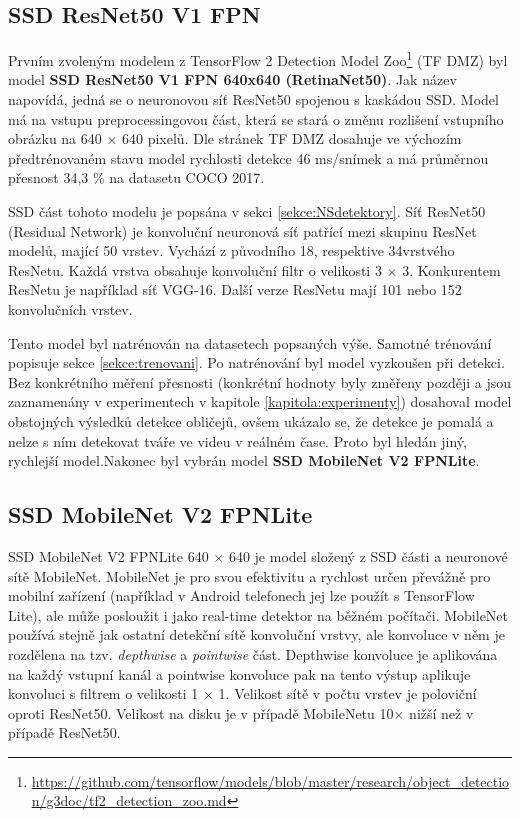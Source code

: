 \subsection*{SSD ResNet50 V1 FPN}
Prvním zvoleným modelem z TensorFlow 2 Detection Model Zoo\footnote{\url{https://github.com/tensorflow/models/blob/master/research/object_detection/g3doc/tf2_detection_zoo.md}} (TF DMZ) byl model \textbf{SSD ResNet50 V1 FPN 640x640 (RetinaNet50)}. Jak název napovídá, jedná se o neuronovou síť ResNet50 spojenou s kaskádou SSD. Model má na vstupu preprocessingovou část, která se stará o změnu rozlišení vstupního obrázku na 640 $\times$ 640 pixelů. Dle stránek TF DMZ dosahuje ve výchozím předtrénovaném stavu model rychlosti detekce 46 ms/snímek a má průměrnou přesnost 34,3 \% na datasetu COCO 2017.

SSD část tohoto modelu je popsána v sekci \ref{sekce:NSdetektory}. Síť ResNet50 (Residual Network) \cite{resnet} je konvoluční neuronová síť patřící mezi skupinu ResNet modelů, mající 50 vrstev. Vychází z původního 18, respektive 34vrstvého ResNetu. Každá vrstva obsahuje konvoluční filtr o velikosti 3 $\times$ 3. Konkurentem ResNetu je například síť VGG-16. Další verze ResNetu mají 101 nebo 152 konvolučních vrstev.

Tento model byl natrénován na datasetech popsaných výše. Samotné trénování popisuje sekce \ref{sekce:trenovani}. Po natrénování byl model vyzkoušen při detekci. Bez konkrétního měření přesnosti (konkrétní hodnoty byly změřeny později a jsou zaznamenány v experimentech v kapitole \ref{kapitola:experimenty}) dosahoval model obstojných výsledků detekce obličejů, ovšem ukázalo se, že detekce je pomalá a nelze s ním detekovat tváře ve videu v reálném čase. Proto byl hledán jiný, rychlejší model.Nakonec byl vybrán model \textbf{SSD MobileNet V2 FPNLite}.

\subsection*{SSD MobileNet V2 FPNLite}
SSD MobileNet V2 FPNLite 640 $\times$ 640 je model složený z SSD části a neuronové sítě MobileNet. MobileNet \cite{mobilenet} je pro svou efektivitu a rychlost určen převážně pro mobilní zařízení (například v Android telefonech jej lze použít s TensorFlow Lite), ale může posloužit i jako real-time detektor na běžném počítači. MobileNet používá stejně jak ostatní  detekční sítě konvoluční vrstvy, ale konvoluce v něm je rozdělena na tzv. \emph{depthwise} a \emph{pointwise} část. Depthwise konvoluce je aplikována na každý vstupní kanál a pointwise konvoluce pak na tento výstup aplikuje konvoluci s filtrem o velikosti 1 $\times$ 1. Velikost sítě v počtu vrstev je poloviční oproti ResNet50. Velikost na disku je v případě MobileNetu 10$\times$ nižší než v případě ResNet50.

